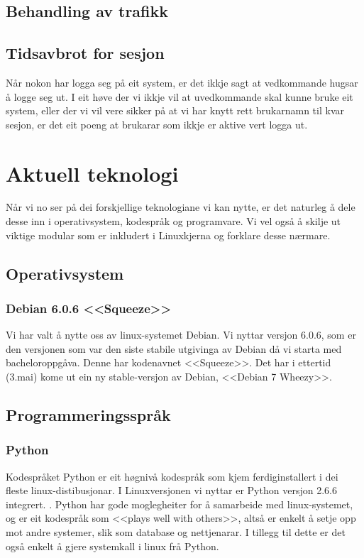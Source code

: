 \documentclass[nynorsk,12pt,a4paper,oneside]{book}
\begin{document}
\subsection{Behandling av trafikk}

\subsection{Tidsavbrot for sesjon}
Når nokon har logga seg på eit system, er det ikkje sagt at vedkommande hugsar å logge seg ut. I eit høve der vi ikkje vil at uvedkommande skal kunne bruke eit system, eller der vi vil vere sikker på at vi har knytt rett brukarnamn til kvar sesjon, er det eit poeng at brukarar som ikkje er aktive vert logga ut. 

\section{Aktuell teknologi}
Når vi no ser på dei forskjellige teknologiane vi kan nytte, er det naturleg å dele desse inn i operativsystem, kodespråk og programvare. Vi vel også å skilje ut viktige modular som er inkludert i Linuxkjerna og forklare desse nærmare.
\subsection{Operativsystem}
\subsubsection{Debian 6.0.6 <<Squeeze>>} 
Vi har valt å nytte oss av linux-systemet Debian. Vi nyttar versjon 6.0.6, som er den versjonen som var den siste stabile utgivinga av Debian då vi starta med bacheloroppgåva. Denne har kodenavnet <<Squeeze>>. Det har i ettertid (3.mai) kome ut ein ny stable-versjon av Debian, <<Debian 7 Wheezy>>. \cite{wheezy}

\subsection{Programmeringsspråk}
\subsubsection{Python}
Kodespråket Python er eit høgnivå kodespråk som kjem ferdiginstallert i dei fleste linux-distibusjonar. I Linuxversjonen vi nyttar er Python versjon 2.6.6 integrert. \cite{pythonversjon}. 
Python har gode moglegheiter for å samarbeide med linux-systemet, og er eit kodespråk som <<plays well with others>>, altså er enkelt å setje opp mot andre systemer, slik som database og nettjenarar. \cite{python, pythonapps} I tillegg til dette er det også enkelt å gjere systemkall i linux frå Python. \cite{pythonsubprocess}
\end{document}
